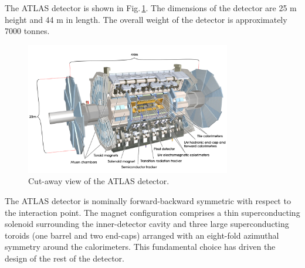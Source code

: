 \documentclass[12pt, twoside]{article}
\numberwithin{equation}{section}
\numberwithin{figure}{section}
\begin{document}
The ATLAS detector is shown in Fig.\,\ref{fig:ATLASDetector}. The dimensions of the detector are 25 m height and 44 m in length. The overall weight of the detector is approximately 7000 tonnes.
\begin{figure}[h]
    \centering
    \includegraphics[width=0.8\textwidth]{./images/ATLAS.jpg}
    \captionsetup{width=0.9\textwidth}
    \caption{Cut-away view of the ATLAS detector.}
    \label{fig:ATLASDetector}
\end{figure}

The ATLAS detector is nominally forward-backward symmetric with respect to the interaction point. The magnet configuration comprises a thin superconducting solenoid surrounding the inner-detector cavity and three large superconducting toroids (one barrel and two end-caps) arranged with an eight-fold azimuthal symmetry around the calorimeters. This fundamental choice has driven the design of the rest of the detector.
\end{document}
